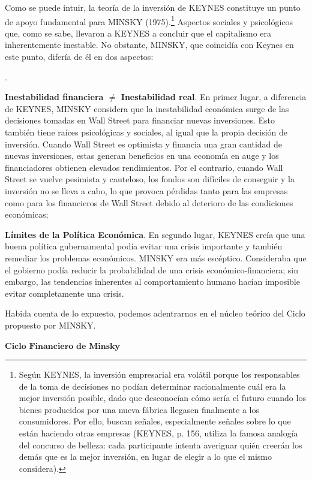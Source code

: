 \documentclass[10pt,a4paper]{article}
\newcounter{numitem}
\newenvironment{lnum}
      {\begin{list}{\arabic{numitem}.}{%
          \usecounter{numitem}%
          \setlength{\leftmargin}{1cm}%
          \setlength{\parskip}{3pt}%
          \setlength{\itemsep}{0pt}%
          \setlength{\parsep}{0pt}%
      }}
      {\end{list}}
\begin{document}
Como se puede intuir, la teoría de la inversión de KEYNES constituye un punto de apoyo fundamental para MINSKY (1975).\footnote{%
    Según KEYNES, la inversión empresarial era volátil porque los responsables de la toma de decisiones no podían determinar racionalmente cuál era la mejor inversión posible, dado que desconocían cómo sería el futuro cuando los bienes producidos por una nueva fábrica llegasen finalmente a los consumidores. Por ello, buscan señales, especialmente señales sobre lo que están haciendo otras empresas (KEYNES, p. 156, utiliza la famosa analogía del concurso de belleza: cada participante intenta averiguar quién creerán los demás que es la mejor inversión, en lugar de elegir a lo que el mismo considera).
} Aspectos sociales y psicológicos que, como se sabe, llevaron a KEYNES a concluir que el capitalismo era inherentemente inestable. No obstante, MINSKY, que coincidía con Keynes en este punto, difería de él en dos aspectos:
\begin{lnum}
    \item \textbf{Inestabilidad financiera $\neq$ Inestabilidad real}. En primer lugar, a diferencia de KEYNES, MINSKY considera que la inestabilidad económica surge de las decisiones tomadas en Wall Street para financiar nuevas inversiones. Esto también tiene raíces psicológicas y sociales, al igual que la propia decisión de inversión. Cuando Wall Street es optimista y financia una gran cantidad de nuevas inversiones, estas generan beneficios en una economía en auge y los financiadores obtienen elevados rendimientos. Por el contrario, cuando Wall Street se vuelve pesimista y cauteloso, los fondos son difíciles de conseguir y la inversión no se lleva a cabo, lo que provoca pérdidas tanto para las empresas como para los financieros de Wall Street debido al deterioro de las condiciones económicas;
    \item \textbf{Límites de la Política Económica}. En segundo lugar, KEYNES creía que una buena política gubernamental podía evitar una crisis importante y también remediar los problemas económicos. MINSKY era más escéptico. Consideraba que el gobierno podía reducir la probabilidad de una crisis económico-financiera; sin embargo, las tendencias inherentes al comportamiento humano hacían imposible evitar completamente una crisis.
\end{lnum}

Habida cuenta de lo expuesto, podemos adentrarnos en el núcleo teórico del Ciclo propuesto por MINSKY.

$\mathbf{\text{Ciclo Financiero de Minsky}}$
\end{document}

